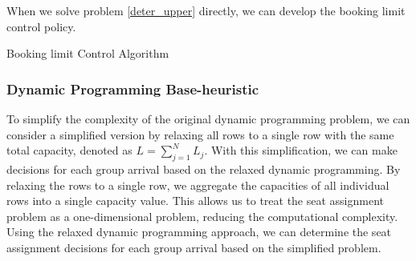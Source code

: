 When we solve problem \eqref{deter_upper} directly, we can develop the booking limit control policy.

\begin{algorithm}[H]
  \caption{Booking limit Control Algorithm}\label{algo_booking}
\end{algorithm}


\subsubsection*{Dynamic Programming Base-heuristic}
To simplify the complexity of the original dynamic programming problem, we can consider a simplified version by relaxing all rows to a single row with the same total capacity, denoted as $L = \sum_{j=1}^{N} L_j$. With this simplification, we can make decisions for each group arrival based on the relaxed dynamic programming. By relaxing the rows to a single row, we aggregate the capacities of all individual rows into a single capacity value. This allows us to treat the seat assignment problem as a one-dimensional problem, reducing the computational complexity. Using the relaxed dynamic programming approach, we can determine the seat assignment decisions for each group arrival based on the simplified problem.




